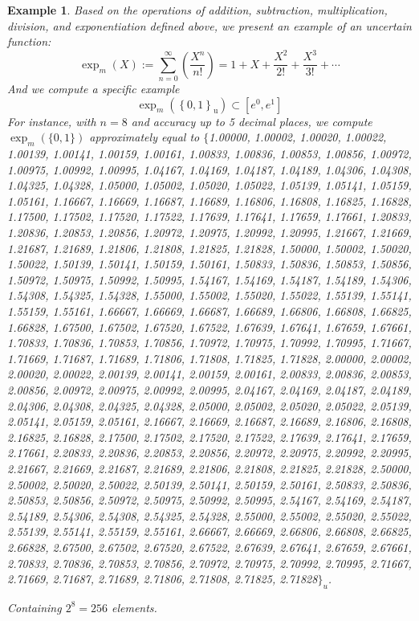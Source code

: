 \documentclass[a4paper,12pt, twoside]{memoir}
\newtheorem{example}{Example}[chapter]
\newcommand{\set}[1]{\left\{#1\right\}} %
\newcommand{\s}[1]{\set{#1}_\mathrm{u}} %
\newcommand{\hbd}[2]{#1_m\left(#2\right)} %
\begin{document}
\begin{example}
	Based on the operations of addition, subtraction, multiplication, division, and exponentiation defined above, we present an example of an uncertain function:
	$$\hbd{\exp}{X} := \sum_{n=0}^{\infty} \left(\frac{X^n}{n!}\right) = 1 + X + \frac{X^2}{2!} + \frac{X^3}{3!} + \cdots$$
	And we compute a specific example $$\hbd{\exp}{\s{0,1}} \subset [e^0,e^1]$$
	For instance, with $n=8$ and accuracy up to 5 decimal places, we compute $\exp_m\left(\{0,1\}\right)$ approximately equal to
	$\{$1.00000, 1.00002, 1.00020, 1.00022, 1.00139, 1.00141, 1.00159, 1.00161, 1.00833, 1.00836, 1.00853, 1.00856, 1.00972, 1.00975, 1.00992, 1.00995, 1.04167, 1.04169, 1.04187, 1.04189, 1.04306, 1.04308, 1.04325, 1.04328, 1.05000, 1.05002, 1.05020, 1.05022, 1.05139, 1.05141, 1.05159, 1.05161, 1.16667, 1.16669, 1.16687, 1.16689, 1.16806, 1.16808, 1.16825, 1.16828, 1.17500, 1.17502, 1.17520, 1.17522, 1.17639, 1.17641, 1.17659, 1.17661, 1.20833, 1.20836, 1.20853, 1.20856, 1.20972, 1.20975, 1.20992, 1.20995, 1.21667, 1.21669, 1.21687, 1.21689, 1.21806, 1.21808, 1.21825, 1.21828, 1.50000, 1.50002, 1.50020, 1.50022, 1.50139, 1.50141, 1.50159, 1.50161, 1.50833, 1.50836, 1.50853, 1.50856, 1.50972, 1.50975, 1.50992, 1.50995, 1.54167, 1.54169, 1.54187, 1.54189, 1.54306, 1.54308, 1.54325, 1.54328, 1.55000, 1.55002, 1.55020, 1.55022, 1.55139, 1.55141, 1.55159, 1.55161, 1.66667, 1.66669, 1.66687, 1.66689, 1.66806, 1.66808, 1.66825, 1.66828, 1.67500, 1.67502, 1.67520, 1.67522, 1.67639, 1.67641, 1.67659, 1.67661, 1.70833, 1.70836, 1.70853, 1.70856, 1.70972, 1.70975, 1.70992, 1.70995, 1.71667, 1.71669, 1.71687, 1.71689, 1.71806, 1.71808, 1.71825, 1.71828, 2.00000, 2.00002, 2.00020, 2.00022, 2.00139, 2.00141, 2.00159, 2.00161, 2.00833, 2.00836, 2.00853, 2.00856, 2.00972, 2.00975, 2.00992, 2.00995, 2.04167, 2.04169, 2.04187, 2.04189, 2.04306, 2.04308, 2.04325, 2.04328, 2.05000, 2.05002, 2.05020, 2.05022, 2.05139, 2.05141, 2.05159, 2.05161, 2.16667, 2.16669, 2.16687, 2.16689, 2.16806, 2.16808, 2.16825, 2.16828, 2.17500, 2.17502, 2.17520, 2.17522, 2.17639, 2.17641, 2.17659, 2.17661, 2.20833, 2.20836, 2.20853, 2.20856, 2.20972, 2.20975, 2.20992, 2.20995, 2.21667, 2.21669, 2.21687, 2.21689, 2.21806, 2.21808, 2.21825, 2.21828, 2.50000, 2.50002, 2.50020, 2.50022, 2.50139, 2.50141, 2.50159, 2.50161, 2.50833, 2.50836, 2.50853, 2.50856, 2.50972, 2.50975, 2.50992, 2.50995, 2.54167, 2.54169, 2.54187, 2.54189, 2.54306, 2.54308, 2.54325, 2.54328, 2.55000, 2.55002, 2.55020, 2.55022, 2.55139, 2.55141, 2.55159, 2.55161, 2.66667, 2.66669, 2.66806, 2.66808, 2.66825, 2.66828, 2.67500, 2.67502, 2.67520, 2.67522, 2.67639, 2.67641, 2.67659, 2.67661, 2.70833, 2.70836, 2.70853, 2.70856, 2.70972, 2.70975, 2.70992, 2.70995, 2.71667, 2.71669, 2.71687, 2.71689, 2.71806, 2.71808, 2.71825, 2.71828$\}_u$.

	Containing $2^8 = 256$ elements.
\end{example}
\end{document}
